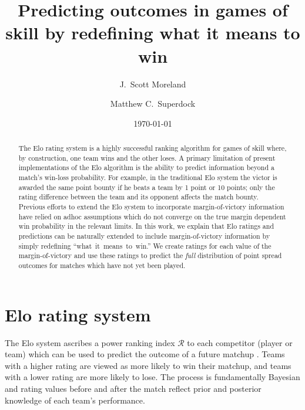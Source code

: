 \documentclass[aps,prc,reprint,amsmath,superscriptaddress]{revtex4-1}
\newcommand{\R}{\mathcal{R}}
\begin{document}
\title{Predicting outcomes in games of skill by redefining what it means to win}

\author{J.\ Scott Moreland}
\author{Matthew C.\ Superdock}

\date{\today}


\begin{abstract}
The Elo rating system is a highly successful ranking algorithm for games of skill where, by construction, one team wins and the other loses.
A primary limitation of present implementations of the Elo algorithm is the ability to predict information beyond a match's win-loss probability.
For example, in the traditional Elo system the victor is awarded the same point bounty if he beats a team by 1 point or 10 points; only the rating difference between the team and its opponent affects the match bounty.
Previous efforts to extend the Elo system to incorporate margin-of-victory information have relied on adhoc assumptions which do not converge on the true margin dependent win probability in the relevant limits.
  In this work, we explain that Elo ratings and predictions can be naturally extended to include margin-of-victory information by simply redefining \mbox{``what it means to win.''}
We create ratings for each value of the margin-of-victory and use these ratings to predict the \emph{full} distribution of point spread outcomes for matches which have not yet been played.
\end{abstract}


\maketitle

\section{Elo rating system}

The Elo system ascribes a power ranking index $\R$ to each competitor (player or team) which can be used to predict the outcome of a future matchup \cite{elo1978rating}.
Teams with a higher rating are viewed as more likely to win their matchup, and teams with a lower rating are more likely to lose.
The process is fundamentally Bayesian and rating values before and after the match reflect prior and posterior knowledge of each team's performance.
\end{document}
